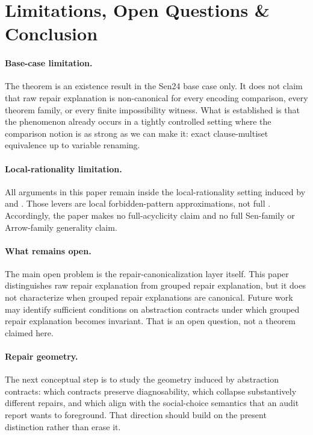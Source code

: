 \section{Limitations, Open Questions \& Conclusion}
\label{sec:conclusion}

\paragraph{Base-case limitation.}
The theorem is an existence result in the Sen24 base case only.
It does not claim that raw repair explanation is non-canonical for every encoding comparison, every theorem family, or every finite impossibility witness.
What is established is that the phenomenon already occurs in a tightly controlled setting where the comparison notion is as strong as we can make it: exact clause-multiset equivalence up to variable renaming.

\paragraph{Local-rationality limitation.}
All arguments in this paper remain inside the local-rationality setting induced by  and .
Those levers are local forbidden-pattern approximations, not full .
Accordingly, the paper makes no full-acyclicity claim and no full Sen-family or Arrow-family generality claim.

\paragraph{What remains open.}
The main open problem is the repair-canonicalization layer itself.
This paper distinguishes raw repair explanation from grouped repair explanation, but it does not characterize when grouped repair explanations are canonical.
Future work may identify sufficient conditions on abstraction contracts under which grouped repair explanation becomes invariant.
That is an open question, not a theorem claimed here.

\paragraph{Repair geometry.}
The next conceptual step is to study the geometry induced by abstraction contracts:
which contracts preserve diagnosability, which collapse substantively different repairs, and which align with the social-choice semantics that an audit report wants to foreground.
That direction should build on the present distinction rather than erase it.

